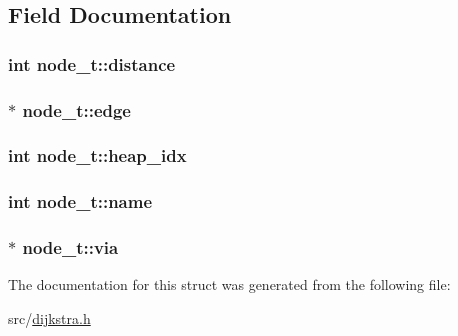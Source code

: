 \subsection{Field Documentation}
\hypertarget{structnode__t_a1566b5def5ac0cf6447a3b6100b56b7b}{
\subsubsection[{distance}]{\setlength{\rightskip}{0pt plus 5cm}int node\-\_\-t\-::distance}}\label{structnode__t_a1566b5def5ac0cf6447a3b6100b56b7b}
\hypertarget{structnode__t_a8d8005e1d452bd7077b820a041130148}{
\subsubsection[{edge}]{$\ast$ node\-\_\-t\-::edge}}\label{structnode__t_a8d8005e1d452bd7077b820a041130148}
\hypertarget{structnode__t_a9b368412223df41a9589b84fd55d941c}{
\subsubsection[{heap\-\_\-idx}]{\setlength{\rightskip}{0pt plus 5cm}int node\-\_\-t\-::heap\-\_\-idx}}\label{structnode__t_a9b368412223df41a9589b84fd55d941c}
\hypertarget{structnode__t_ab187ac72fc7860f8786d13b53ea16917}{
\subsubsection[{name}]{\setlength{\rightskip}{0pt plus 5cm}int node\-\_\-t\-::name}}\label{structnode__t_ab187ac72fc7860f8786d13b53ea16917}
\hypertarget{structnode__t_a74862fd7a526d25509757057abdf263d}{
\subsubsection[{via}]{$\ast$ node\-\_\-t\-::via}}\label{structnode__t_a74862fd7a526d25509757057abdf263d}


The documentation for this struct was generated from the following file\-:\begin{DoxyCompactItemize}
\item 
src/\hyperlink{dijkstra_8h}{dijkstra.\-h}\end{DoxyCompactItemize}
